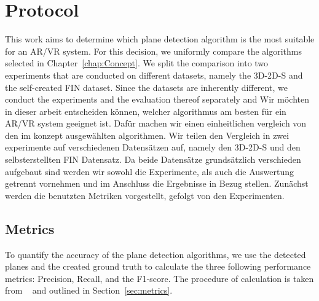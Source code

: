\documentclass[main.tex]{subfiles}
\begin{document}
\section{Protocol}
This work aims to determine which plane detection algorithm is the most suitable for an AR/VR system. For this decision, we uniformly compare the algorithms
selected in Chapter~\ref{chap:Concept}. We split the comparison into two experiments that are conducted on different datasets, namely the 3D-2D-S and the 
self-created FIN dataset. Since the datasets are inherently different, we conduct the experiments and the evaluation thereof separately and 
Wir möchten in dieser arbeit entscheiden können, welcher algorithmus am besten für ein AR/VR system geeignet ist. Dafür machen wir einen einheitlichen
vergleich von den im konzept ausgewählten algorithmen. Wir teilen den Vergleich in zwei experimente auf verschiedenen Datensätzen auf, namely den
3D-2D-S und den selbsterstellten FIN Datensatz. Da beide Datensätze grundsätzlich verschieden aufgebaut sind werden wir sowohl die Experimente, als auch die
Auswertung getrennt vornehmen
und im Anschluss die Ergebnisse in Bezug stellen. Zunächst werden die benutzten Metriken vorgestellt, gefolgt von den Experimenten.



\subsection{Metrics}
To quantify the accuracy of the plane detection algorithms, we use the detected planes and the created ground truth to calculate the three following
performance metrics: Precision, Recall, and the F1-score. The procedure of calculation is taken from ~\cite[Section~4]{Araújo_Oliveira_2020} and outlined
in Section~\ref{sec:metrics}.
\end{document}
